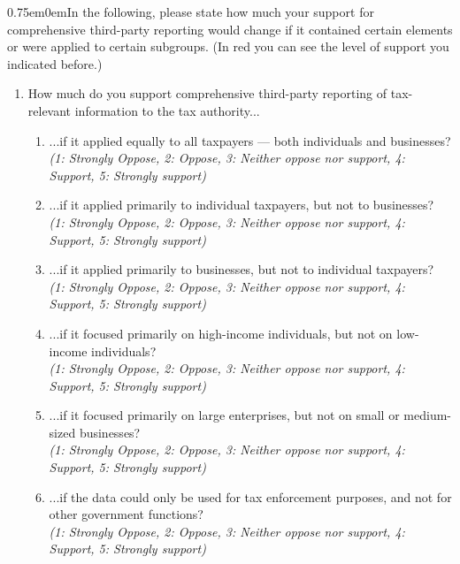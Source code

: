\documentclass[11pt]{article}
\begin{document}
\begin{adjustwidth}{0.75em}{0em}In the following, please state how much your support for comprehensive third-party reporting would change if it contained certain elements or were applied to certain subgroups. (In red you can see the level of support you indicated before.) \end{adjustwidth}  
\begin{enumerate}[resume]
    \item How much do you support comprehensive third-party reporting of tax-relevant information to the tax authority... 

\begin{enumerate}[label=\alph*)]
    \item ...if it applied equally to all taxpayers — both individuals and businesses?\\
    \textit{(1: Strongly Oppose, 2: Oppose, 3: Neither oppose nor support, 4: Support, 5: Strongly support)}
    \item ...if it applied primarily to individual taxpayers, but not to businesses?\\
    \textit{(1: Strongly Oppose, 2: Oppose, 3: Neither oppose nor support, 4: Support, 5: Strongly support)}
    \item ...if it applied primarily to businesses, but not to individual taxpayers?\\
    \textit{(1: Strongly Oppose, 2: Oppose, 3: Neither oppose nor support, 4: Support, 5: Strongly support)}
    \item ...if it focused primarily on high-income individuals, but not on low-income individuals?\\
    \textit{(1: Strongly Oppose, 2: Oppose, 3: Neither oppose nor support, 4: Support, 5: Strongly support)}
    \item ...if it focused primarily on large enterprises, but not on small or medium-sized businesses?\\
    \textit{(1: Strongly Oppose, 2: Oppose, 3: Neither oppose nor support, 4: Support, 5: Strongly support)}
    \item ...if the data could only be used for tax enforcement purposes, and not for other government functions?\\
    \textit{(1: Strongly Oppose, 2: Oppose, 3: Neither oppose nor support, 4: Support, 5: Strongly support)}
    \end{enumerate}
\end{enumerate}    
\end{document}
